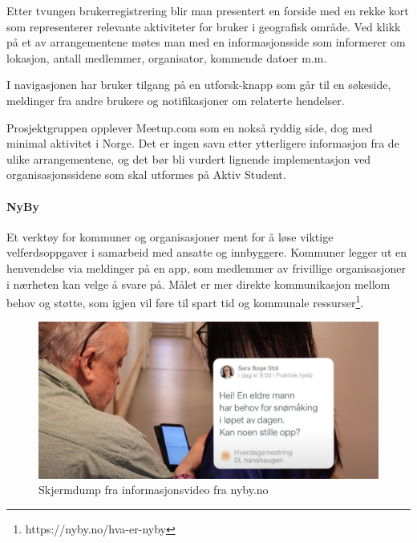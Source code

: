 Etter tvungen brukerregistrering blir man presentert en forside med en rekke kort som representerer relevante aktiviteter for bruker i geografisk område. 
Ved klikk på et av arrangementene møtes man med en informasjonsside som informerer om lokasjon, antall medlemmer, organisator, kommende datoer m.m.

I navigasjonen har bruker tilgang på en utforsk-knapp som går til en søkeside, meldinger fra andre brukere og notifikasjoner om relaterte hendelser.

Prosjektgruppen opplever Meetup.com som en nokså ryddig side, dog med minimal aktivitet i Norge. Det er ingen savn etter ytterligere informasjon fra de ulike arrangementene, og det bør bli vurdert lignende implementasjon ved organisasjonssidene som skal utformes på Aktiv Student.

\paragraph{NyBy} Et verktøy for kommuner og organisasjoner ment for å løse viktige velferdsoppgaver i samarbeid med ansatte og innbyggere. Kommuner legger ut en henvendelse via meldinger på en app, som medlemmer av frivillige organisasjoner i nærheten kan velge å svare på. Målet er mer direkte kommunikasjon mellom behov og støtte, som igjen vil føre til spart tid og kommunale ressurser\footnote{https://nyby.no/hva-er-nyby}.

\begin{figure}[H]
    \centering
    \includegraphics[width=\textwidth]{Illustrasjoner/andre_platformer/nyby_henvendelse.png}
    \caption{Skjermdump fra informasjonsvideo fra nyby.no}
    \label{fig:nyby1}
\end{figure}

